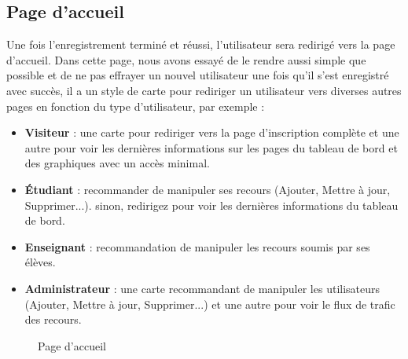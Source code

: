 \documentclass[12pt]{report}
\begin{document}
\vspace*{-0.25in}

\subsection{Page d'accueil}

Une fois l'enregistrement terminé et réussi, l'utilisateur sera redirigé vers la page d'accueil. Dans cette page, nous avons essayé de le rendre aussi simple que possible et de ne pas effrayer un nouvel utilisateur une fois qu'il s'est enregistré avec succès, il a un style de carte pour rediriger un utilisateur vers diverses autres pages en fonction du type d'utilisateur, par exemple :

\begin{itemize}
  \item \textbf{Visiteur} : une carte pour rediriger vers la page d'inscription complète et une autre pour voir les dernières informations sur les pages du tableau de bord et des graphiques avec un accès minimal.
  \item \textbf{Étudiant} : recommander de manipuler ses recours (Ajouter, Mettre à jour, Supprimer...). sinon, redirigez pour voir les dernières informations du tableau de bord.
  \item \textbf{Enseignant} : recommandation de manipuler les recours soumis par ses élèves.
  \item \textbf{Administrateur} : une carte recommandant de manipuler les utilisateurs (Ajouter, Mettre à jour, Supprimer...)
et une autre pour voir le flux de trafic des recours.
\end{itemize}

\newpage

\begin{figure}[h]
\centering
\caption{Page d'accueil}
\end{figure}
\end{document}
